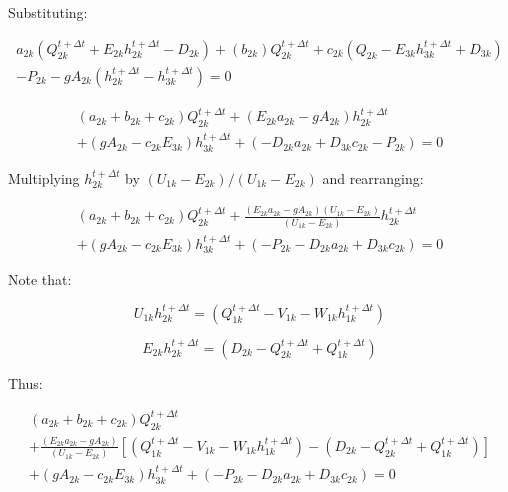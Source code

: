 \documentclass[11pt]{article}
\begin{document}
Substituting:

\begin{equation}
  \begin{split}
    a_{2k} (Q_{2k}^{t + \Delta t} + E_{2k} h_{2k}^{t + \Delta t}
    - D_{2k}) + (b_{2k}) Q_{2k}^{t + \Delta t} + c_{2k} (Q_{2k} - E_{3k} h_{3k}^{t + \Delta t} + D_{3k}) \\ - P_{2k} - g A_{2k}
    (h_{2k}^{t + \Delta t} - h_{3k}^{t + \Delta t}) = 0
  \end{split}
\end{equation}

\begin{equation}
  \begin{split}
    (a_{2k} + b_{2k} + c_{2k})  Q_{2k}^{t + \Delta t} + ( E_{2k} a_{2k} - g A_{2k}) h_{2k}^{t + \Delta t} \\ + (g A_{2k} - c_{2k} E_{3k}) h_{3k}^{t + \Delta t}   
    + (- D_{2k} a_{2k}   + D_{3k} c_{2k} - P_{2k}) = 0 
  \end{split}
\end{equation}

Multiplying $h_{2k}^{t + \Delta t}$ by $(U_{1k} - E_{2k}) / (U_{1k} - E_{2k})$
and rearranging:

\begin{equation}
  \begin{split}
    (a_{2k} + b_{2k} + c_{2k})  Q_{2k}^{t + \Delta t} + \frac{( E_{2k} a_{2k} - g A_{2k})(U_{1k} - E_{2k})}{(U_{1k} - E_{2k})} h_{2k}^{t + \Delta t} \\ + (g A_{2k} - c_{2k} E_{3k}) h_{3k}^{t + \Delta t}   
    + (- P_{2k} - D_{2k} a_{2k}   + D_{3k} c_{2k} ) = 0 
  \end{split}
\end{equation}

Note that:

\begin{equation}
U_{1k} h_{2k}^{t + \Delta t} = (Q_{1k}^{t + \Delta t} - V_{1k} - W_{1k}
h_{1k}^{t + \Delta t})
\end{equation}

\begin{equation}
E_{2k} h_{2k}^{t + \Delta t} = (D_{2k} -
Q_{2k}^{t + \Delta t} + Q_{1k}^{t + \Delta t})
\end{equation}

Thus:

\begin{equation}
  \begin{split}
    (a_{2k} + b_{2k} + c_{2k})  Q_{2k}^{t + \Delta t} \\ + \frac{(E_{2k} a_{2k} - g A_{2k})}{(U_{1k} - E_{2k})} [(Q_{1k}^{t + \Delta t} - V_{1k} - W_{1k} h_{1k}^{t + \Delta t}) - (D_{2k} - Q_{2k}^{t + \Delta t} + Q_{1k}^{t + \Delta t})] \\ + (g A_{2k} - c_{2k} E_{3k}) h_{3k}^{t + \Delta t}   
    + (- P_{2k} - D_{2k} a_{2k}   + D_{3k} c_{2k} ) = 0 
  \end{split}
\end{equation}
\end{document}
